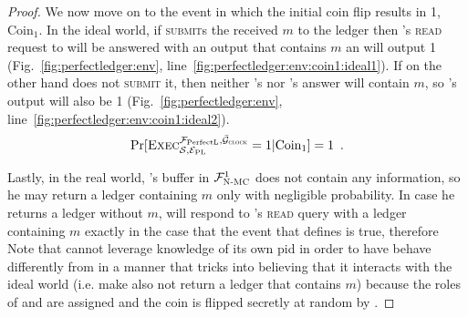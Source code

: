 \begin{proof}
    We now move on to the event in which the initial coin flip results in 1,
    $\mathrm{Coin}_1$. In the ideal world, if \simulator{} \textsc{submit}s the
    received $m$ to the ledger then \environment's \textsc{read} request to
    \bob{} will be answered with an output that contains $m$ an \environment{}
    will output 1 (Fig.~\ref{fig:perfectledger:env},
    line~\ref{fig:perfectledger:env:coin1:ideal1}). If on the other hand
    \simulator{} does not \textsc{submit} it, then neither \bob's nor \alice's
    answer will contain $m$, so \environment's output will also be 1
    (Fig.~\ref{fig:perfectledger:env},
    line~\ref{fig:perfectledger:env:coin1:ideal2}).
    \begin{equation*}
      \Pr[\textsc{Exec}^{\mathcal{F}_{\mathrm{PerfectL}}, \bar{\mathcal{G}}_{\textsc{clock}}}_{\mathcal{S}, \mathcal{E}_{\mathrm{PL}}} = 1
      | \mathrm{Coin}_1] = 1 \enspace.
    \end{equation*}

    Lastly, in the real world, \bob's buffer in $\mathcal{F}_{\textsc{N-MC}}^1$ does not
    contain any information, so he may return a ledger containing $m$ only with
    negligible probability. In case he returns a ledger without $m$, \alice{}
    will respond to \environment's \textsc{read} query with a ledger containing
    $m$ exactly in the case that the event that defines \ppfetches{} is true,
    therefore
    Note that \perfectprot{} cannot leverage knowledge of its own pid in order
    to have \alice{} behave differently from \bob{} in a manner that tricks
    \perfectenv{} into believing that it interacts with the ideal world (i.e.
    make \alice{} also not return a ledger that contains $m$) because the roles
    of \alice{} and \bob{} are assigned and the coin is flipped secretly at
    random by \perfectenv.


\end{proof}

